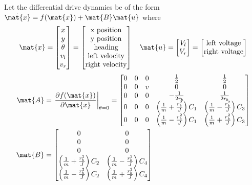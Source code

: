 \begin{theorem}
  \label{thm:linear_time-varying_diff_drive_controller}

  Let the differential drive dynamics be of the form
  $\dot{\mat{x}} = f(\mat{x}) + \mat{B}\mat{u}$ where
  \begin{equation*}
    \mat{x} =
    \begin{bmatrix}
      x \\
      y \\
      \theta \\
      v_l \\
      v_r
    \end{bmatrix} =
    \begin{bmatrix}
      \text{x position} \\
      \text{y position} \\
      \text{heading} \\
      \text{left velocity} \\
      \text{right velocity}
    \end{bmatrix}
    \quad
    \mat{u} =
    \begin{bmatrix}
      V_l \\
      V_r
    \end{bmatrix} =
    \begin{bmatrix}
      \text{left voltage} \\
      \text{right voltage}
    \end{bmatrix}
  \end{equation*}
  \begin{align}
    \mat{A} &=
    \left.\frac{\partial f(\mat{x})}{\partial\mat{x}}\right|_{\theta = 0} =
    \begin{bmatrix}
      0 & 0 & 0 & \frac{1}{2} & \frac{1}{2} \\
      0 & 0 & v & 0 & 0 \\
      0 & 0 & 0 & -\frac{1}{2r_b} & \frac{1}{2r_b} \\
      0 & 0 & 0 & \left(\frac{1}{m} + \frac{r_b^2}{J}\right) C_1 &
        \left(\frac{1}{m} - \frac{r_b^2}{J}\right) C_3 \\
      0 & 0 & 0 & \left(\frac{1}{m} - \frac{r_b^2}{J}\right) C_1 &
        \left(\frac{1}{m} + \frac{r_b^2}{J}\right) C_3
    \end{bmatrix} \\
    \mat{B} &=
    \begin{bmatrix}
      0 & 0 \\
      0 & 0 \\
      0 & 0 \\
      \left(\frac{1}{m} + \frac{r_b^2}{J}\right) C_2 &
      \left(\frac{1}{m} - \frac{r_b^2}{J}\right) C_4 \\
      \left(\frac{1}{m} - \frac{r_b^2}{J}\right) C_2 &
      \left(\frac{1}{m} + \frac{r_b^2}{J}\right) C_4
    \end{bmatrix}
  \end{align}


\end{theorem}
